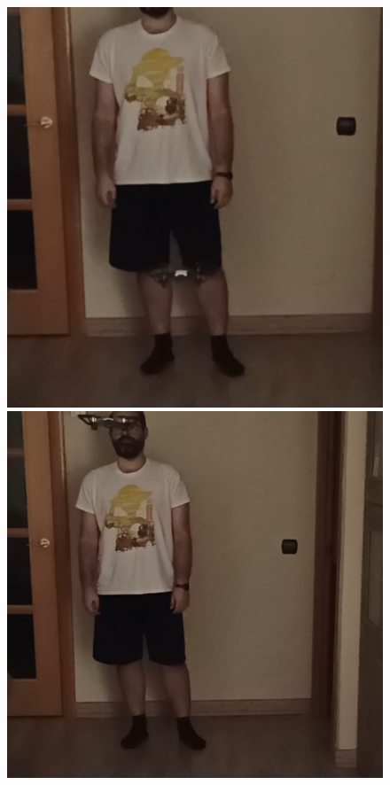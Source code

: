 \begin{figure}[!htb]
    \includegraphics[width=\linewidth]{figures/real/elevacion_1.png}
\endminipage\hfill
{}
    \includegraphics[width=\linewidth]{figures/real/elevacion_2.png}

\end{figure}
